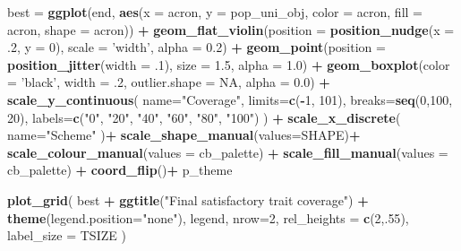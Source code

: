 \documentclass[]{book}
\newenvironment{Shaded}{\begin{snugshade}}{\end{snugshade}}
\newcommand{\DataTypeTok}[1]{\textcolor[rgb]{0.13,0.29,0.53}{#1}}
\newcommand{\DecValTok}[1]{\textcolor[rgb]{0.00,0.00,0.81}{#1}}
\newcommand{\FloatTok}[1]{\textcolor[rgb]{0.00,0.00,0.81}{#1}}
\newcommand{\KeywordTok}[1]{\textcolor[rgb]{0.13,0.29,0.53}{\textbf{#1}}}
\newcommand{\NormalTok}[1]{#1}
\newcommand{\OperatorTok}[1]{\textcolor[rgb]{0.81,0.36,0.00}{\textbf{#1}}}
\newcommand{\OtherTok}[1]{\textcolor[rgb]{0.56,0.35,0.01}{#1}}
\newcommand{\StringTok}[1]{\textcolor[rgb]{0.31,0.60,0.02}{#1}}
\begin{document}
\begin{Shaded}
\begin{Highlighting}[]
\NormalTok{best =}\StringTok{ }\KeywordTok{ggplot}\NormalTok{(end, }\KeywordTok{aes}\NormalTok{(}\DataTypeTok{x =}\NormalTok{ acron, }\DataTypeTok{y =}\NormalTok{ pop_uni_obj, }\DataTypeTok{color =}\NormalTok{ acron, }\DataTypeTok{fill =}\NormalTok{ acron, }\DataTypeTok{shape =}\NormalTok{ acron)) }\OperatorTok{+}
\StringTok{  }\KeywordTok{geom_flat_violin}\NormalTok{(}\DataTypeTok{position =} \KeywordTok{position_nudge}\NormalTok{(}\DataTypeTok{x =} \FloatTok{.2}\NormalTok{, }\DataTypeTok{y =} \DecValTok{0}\NormalTok{), }\DataTypeTok{scale =} \StringTok{'width'}\NormalTok{, }\DataTypeTok{alpha =} \FloatTok{0.2}\NormalTok{) }\OperatorTok{+}
\StringTok{  }\KeywordTok{geom_point}\NormalTok{(}\DataTypeTok{position =} \KeywordTok{position_jitter}\NormalTok{(}\DataTypeTok{width =} \FloatTok{.1}\NormalTok{), }\DataTypeTok{size =} \FloatTok{1.5}\NormalTok{, }\DataTypeTok{alpha =} \FloatTok{1.0}\NormalTok{) }\OperatorTok{+}
\StringTok{  }\KeywordTok{geom_boxplot}\NormalTok{(}\DataTypeTok{color =} \StringTok{'black'}\NormalTok{, }\DataTypeTok{width =} \FloatTok{.2}\NormalTok{, }\DataTypeTok{outlier.shape =} \OtherTok{NA}\NormalTok{, }\DataTypeTok{alpha =} \FloatTok{0.0}\NormalTok{) }\OperatorTok{+}
\StringTok{  }\KeywordTok{scale_y_continuous}\NormalTok{(}
    \DataTypeTok{name=}\StringTok{"Coverage"}\NormalTok{,}
    \DataTypeTok{limits=}\KeywordTok{c}\NormalTok{(}\OperatorTok{-}\DecValTok{1}\NormalTok{, }\DecValTok{101}\NormalTok{),}
    \DataTypeTok{breaks=}\KeywordTok{seq}\NormalTok{(}\DecValTok{0}\NormalTok{,}\DecValTok{100}\NormalTok{, }\DecValTok{20}\NormalTok{),}
    \DataTypeTok{labels=}\KeywordTok{c}\NormalTok{(}\StringTok{"0"}\NormalTok{, }\StringTok{"20"}\NormalTok{, }\StringTok{"40"}\NormalTok{, }\StringTok{"60"}\NormalTok{, }\StringTok{"80"}\NormalTok{, }\StringTok{"100"}\NormalTok{)}
\NormalTok{  ) }\OperatorTok{+}
\StringTok{  }\KeywordTok{scale_x_discrete}\NormalTok{(}
    \DataTypeTok{name=}\StringTok{"Scheme"}
\NormalTok{  )}\OperatorTok{+}
\StringTok{  }\KeywordTok{scale_shape_manual}\NormalTok{(}\DataTypeTok{values=}\NormalTok{SHAPE)}\OperatorTok{+}
\StringTok{  }\KeywordTok{scale_colour_manual}\NormalTok{(}\DataTypeTok{values =}\NormalTok{ cb_palette) }\OperatorTok{+}
\StringTok{  }\KeywordTok{scale_fill_manual}\NormalTok{(}\DataTypeTok{values =}\NormalTok{ cb_palette) }\OperatorTok{+}
\StringTok{  }\KeywordTok{coord_flip}\NormalTok{()}\OperatorTok{+}
\StringTok{  }\NormalTok{p_theme}

\KeywordTok{plot_grid}\NormalTok{(}
\NormalTok{  best }\OperatorTok{+}
\StringTok{    }\KeywordTok{ggtitle}\NormalTok{(}\StringTok{"Final satisfactory trait coverage"}\NormalTok{) }\OperatorTok{+}
\StringTok{    }\KeywordTok{theme}\NormalTok{(}\DataTypeTok{legend.position=}\StringTok{"none"}\NormalTok{),}
\NormalTok{  legend,}
  \DataTypeTok{nrow=}\DecValTok{2}\NormalTok{,}
  \DataTypeTok{rel_heights =} \KeywordTok{c}\NormalTok{(}\DecValTok{2}\NormalTok{,.}\DecValTok{55}\NormalTok{),}
  \DataTypeTok{label_size =}\NormalTok{ TSIZE}
\NormalTok{)}
\end{Highlighting}
\end{Shaded}
\end{document}
